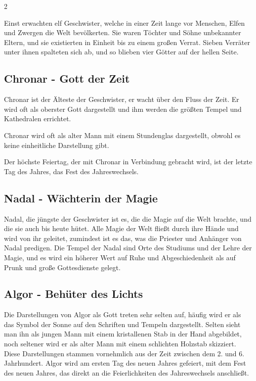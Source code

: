 \begin{multicols}{2}
{Einst erwachten elf Geschwister, welche in einer Zeit lange vor Menschen, Elfen und Zwergen die Welt bevölkerten.
Sie waren Töchter und Söhne unbekannter Eltern, und sie existierten in Einheit bis zu einem großen Verrat.
Sieben Verräter unter ihnen spalteten sich ab, und so blieben vier Götter auf der hellen Seite.

\subsection{Chronar - Gott der Zeit}\label{subsec:chronar-gott-der-zeit}

Chronar ist der Älteste der Geschwister, er wacht über den Fluss der Zeit.
Er wird oft als oberster Gott dargestellt und ihm werden die größten Tempel und Kathedralen errichtet.

Chronar wird oft als alter Mann mit einem Stundenglas dargestellt, obwohl es keine einheitliche Darstellung gibt.

Der höchste Feiertag, der mit Chronar in Verbindung gebracht wird, ist der letzte Tag des Jahres, das Fest des Jahreswechsels.

\subsection{Nadal - Wächterin der Magie}\label{subsec:nadal-wachterin-der-magie}

Nadal, die jüngste der Geschwister ist es, die die Magie auf die Welt brachte, und die sie auch bis heute hütet.
Alle Magie der Welt fließt durch ihre Hände und wird von ihr geleitet, zumindest ist es das, was die Priester und Anhänger von Nadal predigen.
Die Tempel der Nadal sind Orte des Studiums und der Lehre der Magie, und es wird ein höherer Wert auf Ruhe und Abgeschiedenheit als auf Prunk und große Gottesdienste gelegt.

\subsection{Algor - Behüter des Lichts}\label{subsec:algor-behuter-des-lichts}

Die Darstellungen von Algor als Gott treten sehr selten auf, häufig wird er als das Symbol der Sonne auf den Schriften und Tempeln dargestellt.
Selten sieht man ihn als jungen Mann mit einem kristallenen Stab in der Hand abgebildet, noch seltener wird er als alter Mann mit einem schlichten Holzstab skizziert.
Diese Darstellungen stammen vornehmlich aus der Zeit zwischen dem 2.
und 6. Jahrhundert.
Algor wird am ersten Tag des neuen Jahres gefeiert, mit dem Fest des neuen Jahres, das direkt an die Feierlichkeiten des Jahreswechsels anschließt.

}
\end{multicols}
